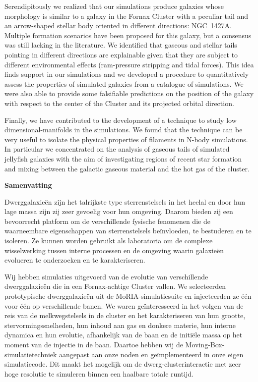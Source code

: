 Serendipitously we realized that our simulations produce galaxies whose morphology is similar to a galaxy in the Fornax Cluster with a peculiar  \Hi{} tail and an arrow-shaped stellar body oriented in different directions: NGC~1427A.
Multiple formation scenarios have been proposed for this galaxy, but a consensus was still lacking in the literature.
We identified that gaseous and stellar tails pointing in different directions are explainable given that they are subject to different environmental effects (ram-pressure stripping and tidal forces). This idea finds support in our simulations and we developed a procedure to quantitatively assess the properties of simulated galaxies from a catalogue of simulations.
We were also able to provide some falsifiable predictions on the position of the galaxy with respect to the center of the Cluster and its projected orbital direction.

Finally, we have contributed to the development of a technique to study low dimensional-manifolds in the simulations.
We found that the technique can be very useful to isolate the physical properties of filaments in N-body simulations.
In particular we concentrated on the analysis of gaseous tails of simulated jellyfish galaxies with the aim of investigating regions of recent star formation and mixing between the galactic gaseous material and the hot gas of the cluster.


\clearpage
\thispagestyle{empty}
\null%
\begin{center}
  {\Large \textbf{Samenvatting}}\\
\end{center}

Dwerggalaxieën zijn het talrijkste type sterrenstelsels in het heelal en door hun lage massa zijn zij zeer gevoelig voor hun omgeving.
Daarom bieden zij een bevoorrecht platform om de verschillende fysische fenomenen die de waarneembare eigenschappen van sterrenstelsels beïnvloeden, te bestuderen en te isoleren.
Ze kunnen worden gebruikt als laboratoria om de complexe wisselwerking tussen interne processen en de omgeving waarin galaxieën evolueren te onderzoeken en te karakteriseren.

Wij hebben simulaties uitgevoerd van de evolutie van verschillende dwerggalaxieën die in een Fornax-achtige Cluster vallen.
We selecteerden prototypische dwerggalaxieën uit de MoRIA-simulatiesuite en injecteerden ze één voor één op verschillende banen.
We waren geïnteresseerd in het volgen van de reis van de melkwegstelsels in de cluster en het karakteriseren van hun grootte, stervormingssnelheden, hun inhoud aan gas en donkere materie, hun interne dynamica en hun evolutie, afhankelijk van de baan en de initiële massa op het moment van de injectie in de baan.
Daartoe hebben wij de Moving-Box-simulatietechniek aangepast aan onze noden en geïmplementeerd in onze eigen simulatiecode.
Dit maakt het mogelijk om de dwerg-clusterinteractie met zeer hoge resolutie te simuleren binnen een haalbare totale runtijd.

